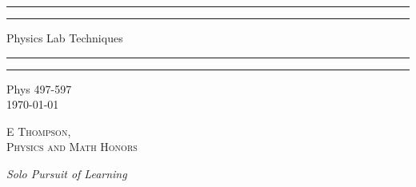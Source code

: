 \documentclass[12pt, a4paper, oneside, openright, titlepage]{book}
\begin{document}

\begin{titlepage}
    \centering
    \scshape
    \vspace*{\baselineskip}
    \rule{\textwidth}{1.6pt}\vspace*{-\baselineskip}\vspace*{2pt}
    \rule{\textwidth}{0.4pt}
    
    \vspace{0.75\baselineskip}
    
    {\LARGE Physics Lab Techniques}
    
    \vspace{0.75\baselineskip}
    
    \rule{\textwidth}{0.4pt}\vspace*{-\baselineskip}\vspace{3.2pt}
    \rule{\textwidth}{1.6pt}
    
    \vspace{2\baselineskip}
    Phys 497-597 \\
    \vspace*{3\baselineskip}
    \monthdayyeardate\today \\
    \vspace*{5.0\baselineskip}
    
    {\scshape\Large E Thompson, \\ Physics and Math Honors\\}
    
    \vspace{1.0\baselineskip}
    \textit{Solo Pursuit of Learning}
    \vfill
    \enlargethispage{1in}
    \begin{figure}[b!]
    \end{figure}
\end{titlepage}
\end{document}
